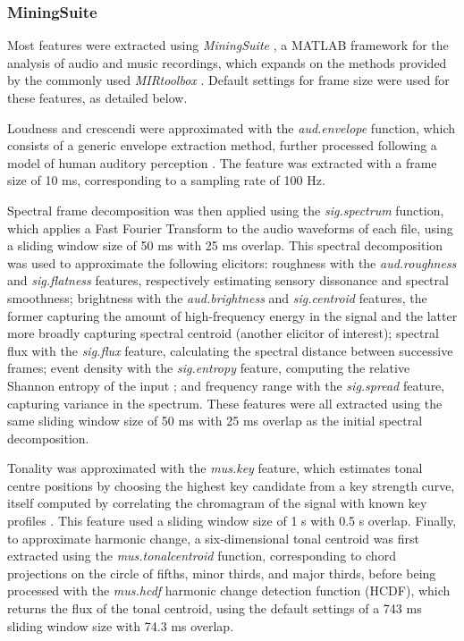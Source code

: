 \subsubsection{MiningSuite}

Most features were extracted using \emph{MiningSuite} \parencite{lartillot2019}, a MATLAB framework for the analysis of audio and music recordings, which expands on the methods provided by the commonly used \emph{MIRtoolbox} \parencite{lartillot2008}. Default settings for frame size were used for these features, as detailed below.

Loudness and crescendi were approximated with the \emph{aud.envelope} function, which consists of a generic envelope extraction method, further processed following a model of human auditory perception \parencite{klapuri2006}. The feature was extracted with a frame size of 10 ms, corresponding to a sampling rate of 100 Hz.

Spectral frame decomposition was then applied using the \emph{sig.spectrum} function, which applies a Fast Fourier Transform to the audio waveforms of each file, using a sliding window size of 50 ms with 25 ms overlap. This spectral decomposition was used to approximate the following elicitors: roughness with the \emph{aud.roughness} and \emph{sig.flatness} features, respectively estimating sensory dissonance and spectral smoothness; brightness with the \emph{aud.brightness} and \emph{sig.centroid} features, the former capturing the amount of high-frequency energy in the signal and the latter more broadly capturing spectral centroid (another elicitor of interest); spectral flux with the \emph{sig.flux} feature, calculating the spectral distance between successive frames; event density with the \emph{sig.entropy} feature, computing the relative Shannon entropy of the input \parencite{shannon1948}; and frequency range with the \emph{sig.spread} feature, capturing variance in the spectrum. These features were all extracted using the same sliding window size of 50 ms with 25 ms overlap as the initial spectral decomposition.

Tonality was approximated with the \emph{mus.key} feature, which estimates tonal centre positions by choosing the highest key candidate from a key strength curve, itself computed by correlating the chromagram of the signal with known key profiles \parencite{gomez2006,krumhansl1990}. This feature used a sliding window size of 1 s with 0.5 s overlap. Finally, to approximate harmonic change, a six-dimensional tonal centroid was first extracted using the \emph{mus.tonalcentroid} function, corresponding to chord projections on the circle of fifths, minor thirds, and major thirds, before being processed with the \emph{mus.hcdf} harmonic change detection function (HCDF), which returns the flux of the tonal centroid, using the default settings of a 743 ms sliding window size with 74.3 ms overlap.

